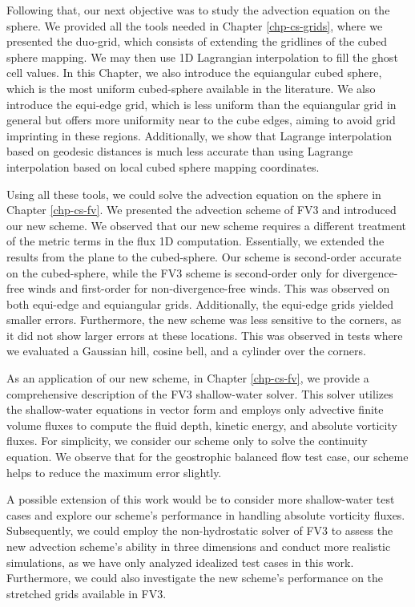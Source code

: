 Following that, our next objective was to study the advection equation on the sphere. 
We provided all the tools needed in Chapter \ref{chp-cs-grids}, 
where we presented the duo-grid, which consists of extending the gridlines of the cubed sphere mapping. 
We may then use 1D Lagrangian interpolation to fill the ghost cell values.
In this Chapter, we also introduce the equiangular cubed sphere, which is the most uniform cubed-sphere available in the literature.
We also introduce the equi-edge grid, which is less uniform than the equiangular grid in general but offers more uniformity near to the cube edges,
aiming to avoid grid imprinting in these regions.
Additionally, we show that Lagrange interpolation based on geodesic distances 
is much less accurate than using Lagrange interpolation based on local cubed sphere mapping coordinates.

Using all these tools, we could solve the advection equation on the sphere in Chapter \ref{chp-cs-fv}.
We presented the advection scheme of FV3 and introduced our new scheme. We observed that our new scheme
requires a different treatment of the metric terms in the flux 1D computation.
Essentially, we extended the results from the plane to the cubed-sphere.
Our scheme is second-order accurate on the cubed-sphere, 
while the FV3 scheme is second-order only for divergence-free winds and first-order for non-divergence-free winds.
This was observed on both equi-edge and equiangular grids. Additionally, the equi-edge grids yielded smaller errors.
Furthermore, the new scheme was less sensitive to the corners, as it did not show larger errors at these locations. 
This was observed in tests where we evaluated a Gaussian hill, cosine bell, and a cylinder over the corners.

As an application of our new scheme, in Chapter \ref{chp-cs-fv}, we provide a comprehensive description of the FV3 shallow-water solver.
This solver utilizes the shallow-water equations in vector form and employs only advective finite volume fluxes
to compute the fluid depth, kinetic energy, and absolute vorticity fluxes. 
For simplicity, we consider our scheme only to solve the continuity equation.
We observe that for the geostrophic balanced flow test case, our scheme helps to reduce the maximum error slightly.

A possible extension of this work would be to consider more shallow-water test cases and explore our scheme's performance in handling absolute vorticity fluxes.
Subsequently, we could employ the non-hydrostatic solver of FV3 to assess the new advection scheme's ability 
in three dimensions and conduct more realistic simulations, as we have only analyzed idealized test cases in this work.
Furthermore, we could also investigate the new scheme's performance on the stretched grids available in FV3.